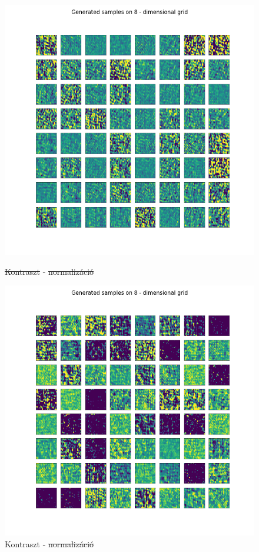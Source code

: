 \documentclass[12pt, english]{article}
\begin{document}
\begin{figure}[H] 
  \begin{minipage}{0.5\linewidth}
    \centering
    \includegraphics[width=.75\linewidth]{contrast/generated_samples_noContrastNorm_noContrast.png} 
    \caption{\st{Kontraszt} - \st{normalizáció}} 
    \label{fig:contrast-generated-1} 
  \end{minipage}%
  \begin{minipage}{0.5\linewidth}
    \centering
    \includegraphics[width=.75\linewidth]{contrast/generated_samples_noContrastNorm_contrast.png} 
    \caption{Kontraszt - \st{normalizáció}} 
    \label{fig:contrast-generated-2} 
  \end{minipage} 
  \begin{minipage}{0.5\linewidth}

\end{minipage}
\end{figure}
\end{document}
